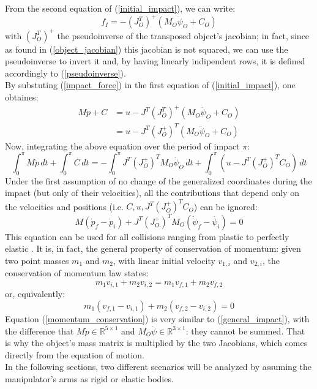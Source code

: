 \documentclass[a4paper,12pt,oneside]{report}
\begin{document}
From the second equation of (\ref{initial_impact}), we can write:
\begin{equation}
  f_I=-(J_O^T)^+(M_O\ddot{\psi}_O+C_O)
  \label{impact_force}
\end{equation}
with $(J_O^T)^+$ the pseudoinverse of the transposed object's jacobian; in fact, since as found in (\ref{object_jacobian}) this jacobian is not squared, we can use the pseudoinverse to invert it and, by having linearly indipendent rows, it is defined accordingly to (\ref{pseudoinverse}).\\
By substuting (\ref{impact_force}) in the first equation of (\ref{initial_impact}), one obtaines:
\begin{equation}
  \begin{split}
  M\ddot{p}+C&=u-J^T(J_O^T)^+(M_O\ddot{\psi}_O+C_O)\\
  &=u-J^T(J_O^+)^T(M_O\ddot{\psi}_O+C_O)
  \end{split}
\end{equation}
Now, integrating the above equation over the period of impact $\pi$:
\begin{equation}
  \int_{0}^{\pi}M\ddot{p}\,dt+\int_{0}^{\pi}C\,dt =-\int_{0}^{\pi}J^T(J_O^+)^TM_O\ddot{\psi}_O\,dt+\int_{0}^{\pi}(u-J^T(J_O^+)^TC_O)\,dt
\end{equation}
Under the first assumption of no change of the generalized coordinates during the impact (but only of their velocities), all the contributions that depend only on the velocities and positions (i.e. $C,u,J^T(J_O^+)^TC_O$) can be ignored:
\begin{equation}
  M(\dot{p}_f-\dot{p}_i)+J^T(J_O^+)^TM_O(\dot{\psi}_f-\dot{\psi_i})=0
  \label{general_impact}
\end{equation}
This equation can be used for all collisions ranging from plastic to perfectly elastic \cite{fifteen,ten}. It is, in fact, the general property of conservation of momentum:  given two point masses $m_1$ and $m_2$, with linear initial velocity $v_{1,i}$ and $v_{2,i}$, the conservation of momentum law states:
\begin{equation}
  m_1v_{i,1}+m_2v_{i,2}=m_1v_{f,1}+m_2v_{f,2}
\end{equation}
or, equivalently:
\begin{equation}
  m_1(v_{f,1}-v_{i,1})+m_2(v_{f,2}-v_{i,2})=0
  \label{momentum_conservation}
\end{equation}
Equation (\ref{momentum_conservation}) is very similar to (\ref{general_impact}), with the difference that $M\dot{p}\in \mathbb{R}^{5\times 1}$ and $M_O\dot{\psi}\in \mathbb{R}^{3\times 1}$: they cannot be summed. That is why the object's mass matrix is multiplied by the two Jacobians, which comes directly from the equation of motion.\\
In the following sections, two different scenarios will be analyzed by assuming the manipulator's arms as rigid or elastic bodies.
\newpage
\end{document}

